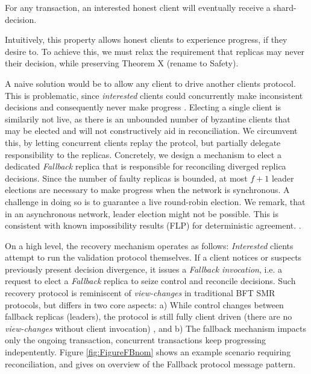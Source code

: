 \begin{theorem}[Liv] 
For any transaction, an interested honest client will eventually receive a shard-decision. 
\end{theorem}

Intuitively, this property allows honest clients to experience progress, if they desire to. To achieve this, we must relax the requirement that replicas may never their decision, while preserving Theorem X (rename to Safety).


A naive solution would be to allow any client to drive another clients protocol. This is problematic, since \textit{interested} clients could concurrently make inconsistent decisions and consequently never make progress . Electing a single client is similarily not live, as there is an unbounded number of byzantine clients that may be elected and will not constructively aid in reconciliation. We circumvent this, by letting concurrent clients replay the protcol, but partially delegate responsibility to the replicas. Concretely, we design a mechanism to elect  a dedicated \textit{Fallback} replica that is responsible for reconciling diverged replica decisions. Since the number of faulty replicas is bounded, at most $f+1$ leader elections are necessary to make progress when the network is synchronous. A challenge in doing so is to guarantee a live round-robin election. We remark, that in an asynchronous network, leader election might not be possible. This is consistent with known impossibility results (FLP) \cite{fischer1985impossibility} for deterministic agreement. .

On a high level, the recovery mechanism operates as follows: \textit{Interested} clients attempt to run the validation protocol themselves. If a client notices or suspects previously present decision divergence, it issues a \textit{Fallback invocation}, i.e. a request to elect a \textit{Fallback} replica to seize control and reconcile decisions. Such recovery protocol is reminiscent of \textit{view-changes} in traditional BFT SMR protocols, but differs in two core aspects: a) While control changes between fallback replicas (leaders), the protocol is still fully client driven (there are no \textit{view-changes} without client invocation) , and b) The fallback mechanism impacts only the ongoing transaction, concurrent transactions keep progressing indepentently. Figure \ref{fig:FigureFBnom} shows an example scenario requiring reconciliation, and gives on overview of the  Fallback protocol message pattern.

